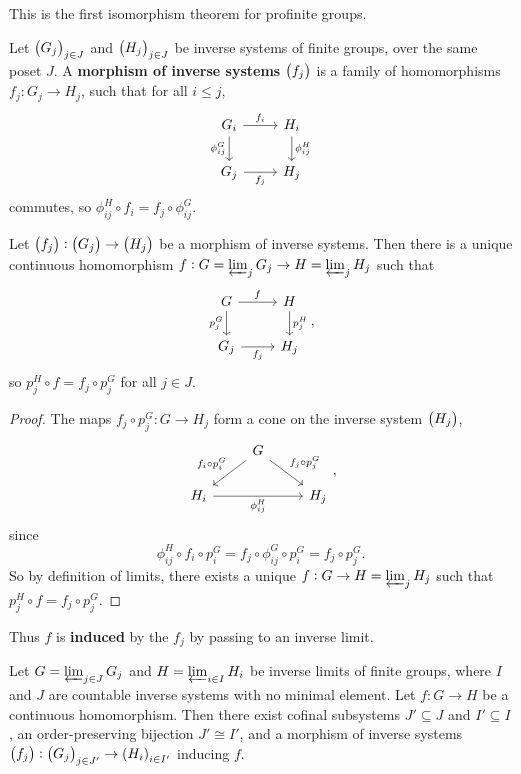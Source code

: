This is the first isomorphism theorem for profinite groups.

\pagebreak


\begin{definition}
Let $ \br{G_j}_{j \in J} $ and $ \br{H_j}_{j \in J} $ be inverse systems of finite groups, over the same poset $ J $. A \textbf{morphism of inverse systems} $ \br{f_j} $ is a family of homomorphisms $ f_j : G_j \to H_j $, such that for all $ i \le j $,
$$
\begin{tikzcd}
G_i \arrow{r}{f_i} \arrow{d}[swap]{\phi_{ij}^G} & H_i \arrow{d}{\phi_{ij}^H} \\
G_j \arrow{r}[swap]{f_j} & H_j
\end{tikzcd}
$$
commutes, so $ \phi_{ij}^H \circ f_i = f_j \circ \phi_{ij}^G $.
\end{definition}

\begin{proposition}
Let $ \br{f_j} : \br{G_j} \to \br{H_j} $ be a morphism of inverse systems. Then there is a unique continuous homomorphism $ f : G = \varprojlim_j G_j \to H = \varprojlim_j H_j $ such that
$$
\begin{tikzcd}
G \arrow{r}{f} \arrow{d}[swap]{p_j^G} & H \arrow{d}{p_j^H} \\
G_j \arrow{r}[swap]{f_j} & H_j
\end{tikzcd},
$$
so $ p_j^H \circ f = f_j \circ p_j^G $ for all $ j \in J $.
\end{proposition}

\begin{proof}
The maps $ f_j \circ p_j^G : G \to H_j $ form a cone on the inverse system $ \br{H_j} $,
$$
\begin{tikzcd}
& G \arrow{dl}[swap]{f_i \circ p_i^G} \arrow{dr}{f_j \circ p_j^G} & \\
H_i \arrow{rr}[swap]{\phi_{ij}^H} & & H_j
\end{tikzcd},
$$
since
$$ \phi_{ij}^H \circ f_i \circ p_i^G = f_j \circ \phi_{ij}^G \circ p_i^G = f_j \circ p_j^G. $$
So by definition of limits, there exists a unique $ f : G \to H = \varprojlim_j H_j $ such that $ p_j^H \circ f = f_j \circ p_j^G $.
\end{proof}

Thus $ f $ is \textbf{induced} by the $ f_j $ by passing to an inverse limit.

\begin{proposition}
\label{prop:2.4.11}
Let $ G = \varprojlim_{j \in J} G_j $ and $ H = \varprojlim_{i \in I} H_i $ be inverse limits of finite groups, where $ I $ and $ J $ are countable inverse systems with no minimal element. Let $ f : G \to H $ be a continuous homomorphism. Then there exist cofinal subsystems $ J' \subseteq J $ and $ I' \subseteq I $, an order-preserving bijection $ J' \cong I' $, and a morphism of inverse systems $ \br{f_j} : \br{G_j}_{j \in J'} \to \br{H_i}_{i \in I'} $ inducing $ f $.
\end{proposition}

